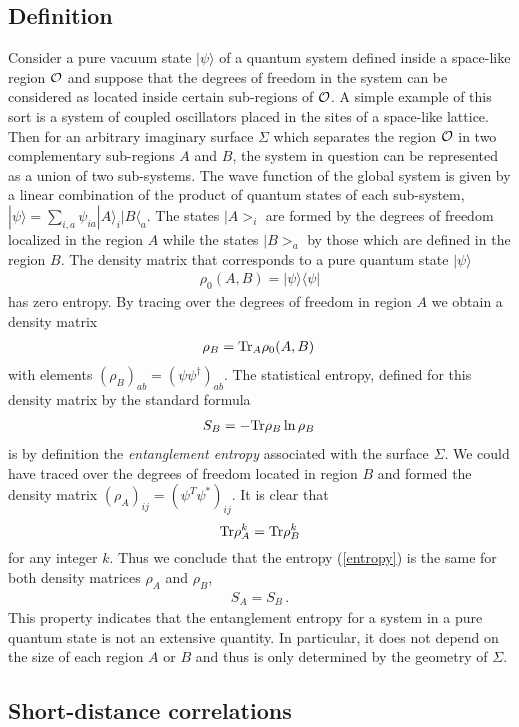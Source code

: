 \documentclass[12pt]{article}
\def\tr{\hbox{Tr}}
\def\be{\begin{eqnarray}}
\def\ee{\end{eqnarray}}
\def\lb{\label}
\begin{document}
\subsection{Definition}
\label{subsection: Definition}

Consider a pure vacuum state $|\psi\rangle$ of a quantum system defined inside a space-like region $\cal O$ and suppose that the degrees of freedom in the system can be considered as located inside certain  sub-regions of $\cal O$.
A simple example of this sort is a system of coupled oscillators placed in the sites of a space-like lattice.  Then for an arbitrary imaginary  surface $\Sigma$ which separates the region $\cal O$  in two complementary sub-regions $A$ and $B$,  the system in question can be represented as a union of two sub-systems.  The wave function of the global system is given by a linear combination of the product of quantum states  of each sub-system, $|\psi\rangle=\sum_{i,a}\psi_{ia}|A\rangle_i|B\langle_a$.  The states $|A>_i$ are formed by the  degrees of freedom  localized in the region $A$  while the states $|B>_a$ by those which are defined in the region $B$.  The density matrix that corresponds to a pure quantum  state $|\psi\rangle$ 
\be
\rho_0(A,B)=|\psi\rangle\langle\psi|
\lb{density-pure_state}
\ee
has zero entropy. By tracing over the degrees of freedom in region $A$ we obtain a density matrix 
\be
\rho_B=\tr_A\rho_0(A,B)\, 
\lb{trace-rho}
\ee
with elements $(\rho_{B})_{ab}=(\psi\psi^\dagger)_{ab}$. The statistical entropy, defined for this density  matrix by the standard formula
\be
S_{B}=-\tr\rho_{B}\ln\rho_{B}\, 
\lb{entropy}
\ee
is by definition the \emph{entanglement entropy} associated with the surface $\Sigma$. We could  have traced over the degrees of freedom located in region $B$ and formed the density matrix $(\rho_{A})_{ij}=(\psi^T\psi^*)_{ij}$. It is clear that 
$$
\tr \rho_{A}^k=\tr \rho_{B}^k
$$
 for any integer $k$.  Thus we conclude that the entropy (\ref{entropy}) is the same for both  density matrices $\rho_{A}$ and $\rho_{B}$, 
\be
S_{A}=S_{B}\, .
\lb{in=out}
\ee
This property indicates that the entanglement entropy for a system in a pure quantum state is not an extensive quantity. In particular, it does not depend on the size of each region  $A$ or $B$ and thus is only determined by the geometry of $\Sigma$.

\subsection{Short-distance correlations}
\end{document}
